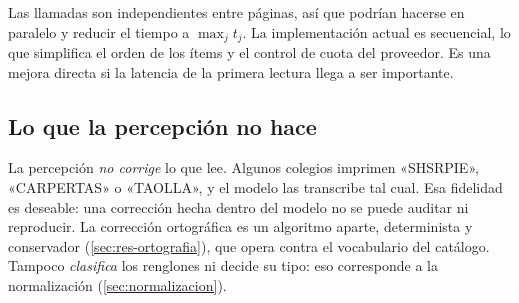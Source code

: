 \begin{observacion}[Paralelismo]
Las llamadas son independientes entre páginas, así que podrían hacerse en
paralelo y reducir el tiempo a $\max_j t_j$. La implementación actual es
secuencial, lo que simplifica el orden de los ítems y el control de cuota del
proveedor. Es una mejora directa si la latencia de la primera lectura llega a
ser importante.
\end{observacion}

\subsection{Lo que la percepción no hace}

La percepción \emph{no corrige} lo que lee. Algunos colegios imprimen
«SHSRPIE», «CARPERTAS» o «TAOLLA», y el modelo las transcribe tal cual. Esa
fidelidad es deseable: una corrección hecha dentro del modelo no se puede
auditar ni reproducir. La corrección ortográfica es un algoritmo aparte,
determinista y conservador (\cref{sec:res-ortografia}), que opera contra el
vocabulario del catálogo. Tampoco \emph{clasifica} los renglones ni decide su
tipo: eso corresponde a la normalización (\cref{sec:normalizacion}).

